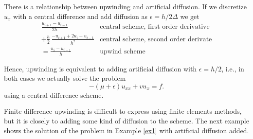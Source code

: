 \documentclass[a4paper,11pt]{amsart}
\begin{document}
There is a relationship between upwinding and artificial diffusion.  If we discretize $u_x$ with a central difference and add diffusion as $\epsilon =h/2 \Delta $ we get
\begin{eqnarray*}
 \frac{u_{i+1}  -  u_{i-1}}{2 h}    &  \textrm{central scheme, first order derivative}  \\
+ \frac{h}{2} \, \frac{-u_{i+1}   + 2 u_{i}    -u_{i-1}}{h^2}  &  \textrm{central scheme, second order derivate}   \\
= \frac{u_{i} -u_{i-1}}{h} &  \textrm{upwind scheme}   
\end{eqnarray*}

\noindent
Hence, upwinding is equivalent to adding artificial diffusion with $\epsilon=h/2$, i.e., in both cases we actually solve the problem
\[-(\mu+\epsilon)u_{xx} + vu_x = f.\]
using a central difference scheme. 

Finite difference upwinding is difficult to express using finite elements methods, but
it is closely to adding some kind of diffusion to the scheme.  
The next example shows the solution of the problem in Example \ref{ex1} with 
artificial diffusion added. 
\end{document}
